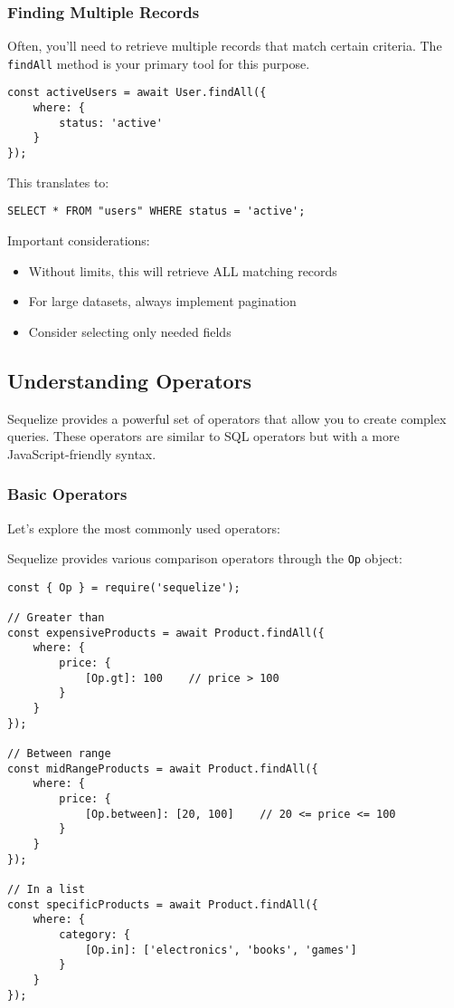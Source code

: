 \documentclass[12pt,a4paper]{book}
\begin{document}
	\subsubsection{Finding Multiple Records}
	Often, you'll need to retrieve multiple records that match certain criteria. The \texttt{findAll} method is your primary tool for this purpose.
	
	\begin{tcolorbox}[title=Basic FindAll Usage]
		\begin{verbatim}
const activeUsers = await User.findAll({
	where: {
		status: 'active'
	}
});
		\end{verbatim}
		
		This translates to:
		\begin{verbatim}
SELECT * FROM "users" WHERE status = 'active';
		\end{verbatim}
		
		Important considerations:
		\begin{itemize}
			\item Without limits, this will retrieve ALL matching records
			\item For large datasets, always implement pagination
			\item Consider selecting only needed fields
		\end{itemize}
	\end{tcolorbox}
	
	\subsection{Understanding Operators}
	Sequelize provides a powerful set of operators that allow you to create complex queries. These operators are similar to SQL operators but with a more JavaScript-friendly syntax.
	
	\subsubsection{Basic Operators}
	Let's explore the most commonly used operators:
	
	
		Sequelize provides various comparison operators through the \texttt{Op} object:
		
		\begin{verbatim}
const { Op } = require('sequelize');

// Greater than
const expensiveProducts = await Product.findAll({
	where: {
		price: {
			[Op.gt]: 100    // price > 100
		}
	}
});

// Between range
const midRangeProducts = await Product.findAll({
	where: {
		price: {
			[Op.between]: [20, 100]    // 20 <= price <= 100
		}
	}
});

// In a list
const specificProducts = await Product.findAll({
	where: {
		category: {
			[Op.in]: ['electronics', 'books', 'games']
		}
	}
});
		\end{verbatim}
		
\end{document}
